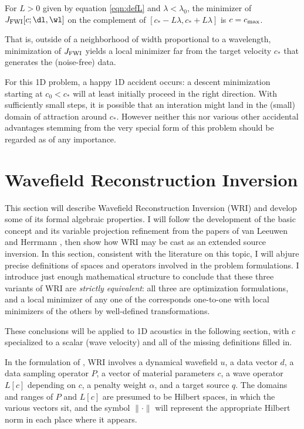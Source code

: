 \begin{theorem}
  \label{thm:thm1}
  For $L>0$ given by equation \ref{eqn:defL} and $\lambda <
  \lambda_0$, the minimizer of $J_{\rm FWI}[c;\dl,\wl]$ on the
  complement of $[c_*-L\lambda, c_*+L\lambda]$ is $c=c_{\rm max}$.
\end{theorem}

That is, outside of a neighborhood of width proportional to a
wavelength, minimization of $J_{\rm FWI}$ yields a local minimizer far from
the target velocity $c_*$ that generates the (noise-free) data.

For this 1D problem, a happy 1D accident occurs: a descent
minimization starting at $c_0 < c_*$ will at least initially proceed
in the right direction. With sufficiently small steps, it is possible
that an interation might land in the (small) domain of attraction
around $c_*$. However neither this nor various other accidental
advantages stemming from the very special form of this problem should
be regarded as of any importance.
 
\section{Wavefield Reconstruction Inversion}
This section will describe Wavefield Reconstruction Inversion (WRI)
and develop some of its formal algebraic properties. I will follow the
development of the basic concept and its variable projection
refinement from the papers of van Leeuwen and Herrmann
\cite[]{LeeuwenHerrmannWRI:13,LeeuwenHerrmann:16}, then show how
WRI may be cast as an extended source inversion. In this section,
consistent with the literature on this topic, I will abjure precise
definitions of spaces and operators involved in the problem
formulations. I introduce just enough mathematical structure to
conclude that these three variants of WRI are {\em strictly
  equivalent}: all three are optimization formulations, and a local
minimizer of any one of the corresponds one-to-one with local
minimizers of the others by well-defined transformations.

These conclusions will be applied to 1D acoustics in the following
section, with $c$ specialized to a scalar (wave velocity) and all of
the missing definitions filled in.

In the formulation of \cite{LeeuwenHerrmannWRI:13}, WRI involves a
dynamical wavefield $u$, a data vector $d$, a data sampling operator
$P$, a vector of material parameters $c$, a wave operator $L[c]$
depending on $c$, a penalty weight $\alpha$, and a target source
$q$. The domains and ranges of $P$ and $L[c]$ are presumed to be
Hilbert spaces, in which the various vectors sit, and the symbol
$\|\cdot\|$ will represent the appropriate Hilbert norm in each place
where it appears.

